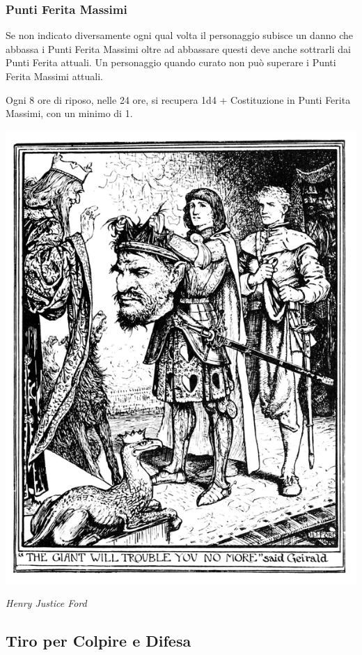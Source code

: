 \begin{multicols}{2}
\subsubsection{Punti Ferita Massimi}\label{puntiferitamassimi}

Se non indicato diversamente ogni qual volta il personaggio subisce un danno che abbassa i Punti Ferita Massimi oltre ad abbassare questi deve anche sottrarli dai Punti Ferita attuali. Un personaggio quando curato non può superare i Punti Ferita Massimi attuali.

Ogni 8 ore di riposo, nelle 24 ore, si recupera 1d4 + Costituzione in Punti Ferita Massimi, con un minimo di 1.

\end{multicols}

\vfill

\begin{center}


\includegraphics[width=0.45\linewidth]{immagini/giantdeath.png}

\emph{Henry Justice Ford}

\end{center}

\pagebreak

\subsection{Tiro per Colpire e Difesa}\label{tiropercolpireedifesa}\hypertarget{tiropercolpireedifesa}{}

